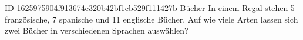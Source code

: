 \begin{exercise}
      {ID-1625975904f913674e320b42bf1cb529f111427b}
      {Bücher}
  \ifproblem\problem
    In einem Regal stehen 5 französische, 7 spanische und 11 englische Bücher.
    Auf wie viele Arten lassen sich zwei Bücher in verschiedenen Sprachen
    auswählen?
  \fi
\end{exercise}
